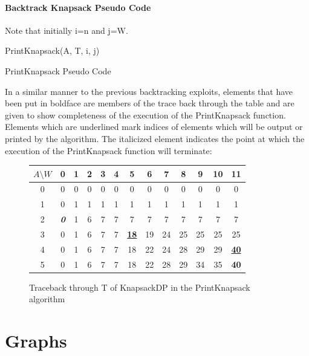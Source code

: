 \documentclass[12pt,letterpaper]{article}
\begin{document}
\subsection{Backtrack Knapsack Pseudo Code}
Note that initially i=n and j=W.
\begin{algorithm}
PrintKnapsack(A, T, i, j)	
\caption{PrintKnapsack Pseudo Code}
\label{PrintKnapsack}
\end{algorithm}
\FloatBarrier
In a similar manner to the previous backtracking exploits, elements that have been put in boldface are members of the trace back through the table and are given to show completeness of the execution of the PrintKnapsack function. Elements which are underlined mark indices of elements which will be output or printed by the algorithm. The italicized element indicates the point at which the execution of the PrintKnapsack function will terminate:
\begin{figure}[h]
\centering
\begin{tabular}{|c|c|c|c|c|c|c|c|c|c|c|c|c|}
\hline
$A\setminus W$&0&1&2&3&4&5&6&7&8&9&10&11\\ \hline \hline
0&0&0&0&0&0&0&0&0&0&0&0&0\\ \hline
1&0&1&1&1&1&1&1&1&1&1&1&1\\ \hline
2&\textbf{\textit{0}}&1&6&7&7&7&7&7&7&7&7&7\\ \hline
3&0&1&6&7&7&\textbf{\underline{18}}&19&24&25&25&25&25\\ \hline
4&0&1&6&7&7&18&22&24&28&29&29&\textbf{\underline{40}}\\ \hline
5&0&1&6&7&7&18&22&28&29&34&35&\textbf{40}\\ \hline
\end{tabular}
\caption{Traceback through T of KnapsackDP in the PrintKnapsack algorithm}
\end{figure}
\FloatBarrier
\part{Graphs}
\end{document}
